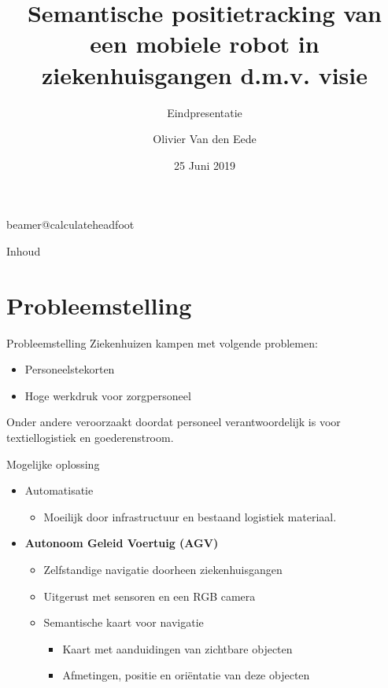 \documentclass[11pt,t]{beamer}
\title[Eindpresentatie]{Semantische positietracking van een mobiele robot in ziekenhuisgangen d.m.v. visie} %
\subtitle{Eindpresentatie}
\author{Olivier Van den Eede}
\institute{KU Leuven - De Nayer}
\date{25 Juni 2019}
\begin{document}
\csname beamer@calculateheadfoot\endcsname %


\begin{frame}
	\titlepage
\end{frame}
	

\begin{frame}{Inhoud}
	\hfill	{\large \parbox{.961\textwidth}{\tableofcontents[hideothersubsections]}}
\end{frame}




\section{Probleemstelling}
\begin{frame}[fragile]{Probleemstelling}
	Ziekenhuizen kampen met volgende problemen:
	\begin{itemize}
		\item Personeelstekorten
		\item Hoge werkdruk voor zorgpersoneel
	\end{itemize}

	Onder andere veroorzaakt doordat personeel verantwoordelijk is voor textiellogistiek en goederenstroom.
\end{frame}

\begin{frame}[fragile]{Mogelijke oplossing}
	\begin{itemize}
		\item Automatisatie
		\begin{itemize}
			\item Moeilijk door infrastructuur en bestaand logistiek materiaal.
		\end{itemize}
		\item \textbf{Autonoom Geleid Voertuig (AGV)}
		\begin{itemize}
			\item Zelfstandige navigatie doorheen ziekenhuisgangen
			\item Uitgerust met sensoren en een RGB camera
			\item Semantische kaart voor navigatie
			\begin{itemize}
				\item Kaart met aanduidingen van zichtbare objecten
				\item Afmetingen, positie en ori\"{e}ntatie van deze objecten
			\end{itemize}
		\end{itemize}
	\end{itemize}
\end{frame}
\end{document}
